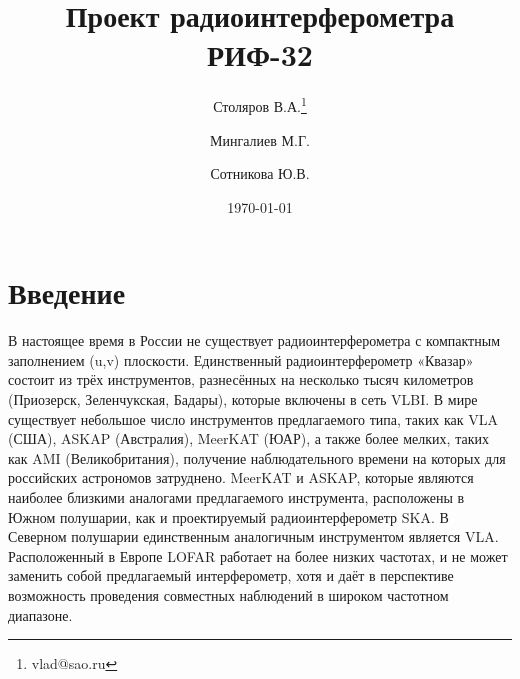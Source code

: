\documentclass[10pt,a4paper]{article}
\begin{document}
\title{Проект радиоинтерферометра РИФ-32}  

\date{\today}

\author[1,2,3]{Столяров В.А.\thanks{vlad@sao.ru}}
\author[2,3]{Мингалиев М.Г.}
\author[2]{Сотникова Ю.В.}

\renewcommand\Authand{ и }
\renewcommand\Authands{ и }

	\maketitle


\section{Введение}
В настоящее время в России не существует радиоинтерферометра с компактным заполнением (u,v) плоскости. Единственный радиоинтерферометр «Квазар»  состоит из трёх инструментов, разнесённых на несколько тысяч километров (Приозерск, Зеленчукская, Бадары), которые включены в сеть VLBI.
В мире существует небольшое число инструментов предлагаемого типа, таких как VLA (США), ASKAP (Австралия), MeerKAT (ЮАР), а также более мелких, таких как AMI (Великобритания), получение наблюдательного времени на которых для российских астрономов затруднено. MeerKAT и ASKAP, которые являются наиболее близкими аналогами предлагаемого инструмента, расположены в Южном полушарии, как и проектируемый радиоинтерферометр SKA. В Северном полушарии единственным аналогичным инструментом является VLA. Расположенный в Европе LOFAR работает на более низких частотах, и не может заменить собой предлагаемый интерферометр, хотя и даёт в перспективе возможность проведения совместных наблюдений в широком частотном диапазоне.
\end{document}

